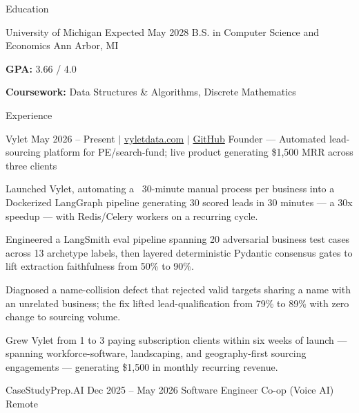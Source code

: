 \documentclass[
	11pt
]{../../../template}
\begin{document}
	\begin{rSection}{E}{ducation}
		\begin{rSectionEntry}
			{University of Michigan}
			{Expected May 2028}
			{B.S. in Computer Science and Economics}
			{}
			{Ann Arbor, MI}

			\item \textbf{GPA:} 3.66 / 4.0
			\item \textbf{Coursework:} Data Structures \& Algorithms, Discrete Mathematics
		\end{rSectionEntry}
	\end{rSection}

	\begin{rSection}{E}{xperience}
		\begin{rSectionEntry}
			{Vylet}
			{May 2026 -- Present $\vert$ \href{https://vyletdata.com}{vyletdata.com} $\vert$ \href{https://github.com/Verdent06/Lead-Gen-Agentic-Pipeline}{GitHub}}
			{Founder --- Automated lead-sourcing platform for PE/search-fund; live product generating \$1,500 MRR across three clients}
			{}
			{}

			\item Launched Vylet, automating a ~30-minute manual process per business into a Dockerized LangGraph pipeline generating 30 scored leads in 30 minutes --- a 30x speedup --- with Redis/Celery workers on a recurring cycle.
			\item Engineered a LangSmith eval pipeline spanning 20 adversarial business test cases across 13 archetype labels, then layered deterministic Pydantic consensus gates to lift extraction faithfulness from 50\% to 90\%.
			\item Diagnosed a name-collision defect that rejected valid targets sharing a name with an unrelated business; the fix lifted lead-qualification from 79\% to 89\% with zero change to sourcing volume.
			\item Grew Vylet from 1 to 3 paying subscription clients within six weeks of launch --- spanning workforce-software, landscaping, and geography-first sourcing engagements --- generating \$1,500 in monthly recurring revenue.
		\end{rSectionEntry}

		\begin{rSectionEntry}
			{CaseStudyPrep.AI}
			{Dec 2025 -- May 2026}
			{Software Engineer Co-op (Voice AI)}
			{}
			{Remote}


\end{rSectionEntry}
\end{rSection}
\end{document}
